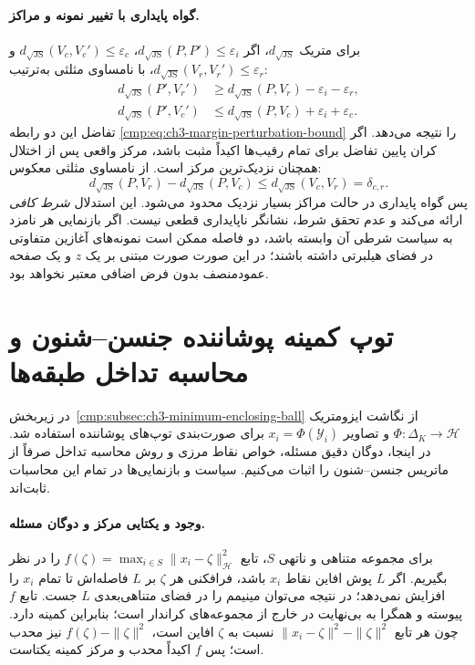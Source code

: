 \paragraph{گواه پایداری با تغییر نمونه و مراکز.}
برای متریک $d_{\sqrt{\mathrm{JS}}}$،
اگر $d_{\sqrt{\mathrm{JS}}}(P,P')\le\varepsilon_i$،
$d_{\sqrt{\mathrm{JS}}}(V_c,V_c')\le\varepsilon_c$ و
$d_{\sqrt{\mathrm{JS}}}(V_r,V_r')\le\varepsilon_r$،
با نامساوی مثلثی به‌ترتیب:
\[
\begin{aligned}
d_{\sqrt{\mathrm{JS}}}(P',V_r')&\ge
d_{\sqrt{\mathrm{JS}}}(P,V_r)-\varepsilon_i-\varepsilon_r,\\
d_{\sqrt{\mathrm{JS}}}(P',V_c')&\le
d_{\sqrt{\mathrm{JS}}}(P,V_c)+\varepsilon_i+\varepsilon_c.
\end{aligned}
\]
تفاضل این دو رابطه
\eqref{cmp:eq:ch3-margin-perturbation-bound}
را نتیجه می‌دهد.
اگر کران پایین تفاضل
برای تمام رقیب‌ها اکیداً
مثبت باشد، مرکز واقعی
پس از اختلال همچنان
نزدیک‌ترین مرکز است.
از نامساوی مثلثی معکوس:
\[
d_{\sqrt{\mathrm{JS}}}(P,V_r)-d_{\sqrt{\mathrm{JS}}}(P,V_c)
\le d_{\sqrt{\mathrm{JS}}}(V_c,V_r)=\delta_{c,r}.
\]
پس گواه پایداری
در حالت مراکز بسیار
نزدیک محدود می‌شود.
این استدلال
\emph{شرط کافی} ارائه
می‌کند و عدم تحقق شرط،
نشانگر ناپایداری قطعی نیست.
اگر بازنمایی هر نامزد
به سیاست شرطی آن
وابسته باشد، دو فاصله
ممکن است نمونه‌های
آغازین متفاوتی
در فضای هیلبرتی
داشته باشند؛
در این صورت صورت
مبتنی بر یک $z$
و یک صفحه عمودمنصف
بدون فرض اضافی
معتبر نخواهد بود.


\section{توپ کمینه پوشاننده جنسن--شنون و محاسبه تداخل طبقه‌ها}
\label{app:ch3-js-enclosing-balls}
در زیربخش~\ref{cmp:subsec:ch3-minimum-enclosing-ball}
از نگاشت ایزومتریک
$\Phi:\Delta_K\to\mathcal H$
و تصاویر
$x_i=\Phi(\mathscr Y_i)$
برای صورت‌بندی توپ‌های پوشاننده استفاده شد.
در اینجا، دوگان دقیق مسئله،
خواص نقاط مرزی و روش محاسبه تداخل
صرفاً از ماتریس جنسن--شنون را
اثبات می‌کنیم. سیاست و بازنمایی‌ها
در تمام این محاسبات ثابت‌اند.

\paragraph{وجود و یکتایی مرکز و دوگان مسئله.}
برای مجموعه متناهی و ناتهی
$S$، تابع
$f(\zeta)=\max_{i\in S}
\|x_i-\zeta\|_{\mathcal H}^2$
را در نظر بگیریم.
اگر $L$ پوش افاین نقاط $x_i$ باشد،
فرافکنی هر $\zeta$ بر $L$
فاصله‌اش تا تمام $x_i$ را
افزایش نمی‌دهد؛ در نتیجه
می‌توان مینیمم را در فضای
متناهی‌بعدی $L$ جست.
تابع $f$ پیوسته و همگرا به
بی‌نهایت در خارج از مجموعه‌های کراندار
است؛ بنابراین کمینه دارد.
چون هر تابع
$\|x_i-\zeta\|^2-\|\zeta\|^2$
نسبت به $\zeta$ افاین است،
$f(\zeta)-\|\zeta\|^2$
نیز محدب است؛ پس $f$
اکیداً محدب و مرکز کمینه یکتاست.

